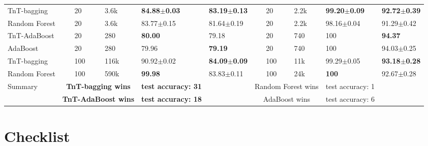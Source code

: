 \documentclass{article}
\begin{document}
\begin{table}[!htbp]
{\begin{tabular}{lllllllllll}
     TnT-bagging & & 20 &  3.6k  & \textbf{84.88$\pm$0.03} & \textbf{83.19$\pm$0.13} &
     & 20 &  2.2k  & \textbf{99.20$\pm$0.09} & \textbf{92.72$\pm$0.39} \\
     Random Forest & & 20 & 3.6k & 83.77$\pm$0.15 & 81.64$\pm$0.19 &
     & 20 & 2.2k & 98.16$\pm$0.04 & 91.29$\pm$0.42  \\\cmidrule{3-6} \cmidrule{8-11}
     TnT-AdaBoost & & 20 &  280  & \textbf{80.00} & 79.18 &
     & 20 &  740  & 100 & \textbf{94.37} \\
     AdaBoost & & 20 &  280 & 79.96 & \textbf{79.19} &
     & 20 &  740 & 100 & 94.03$\pm$0.25 \\\cmidrule{3-6} \cmidrule{8-11}
     
     TnT-bagging & & 100 &  116k  & 90.92$\pm$0.02 & \textbf{84.09$\pm$0.09} &
     & 100 &  11k  & 99.29$\pm$0.05 & \textbf{93.18$\pm$0.28}  \\
     Random Forest & & 100 & 590k & \textbf{99.98} & 83.83$\pm$0.11 &
     & 100 & 24k & \textbf{100} & 92.67$\pm$0.28\\
     
     \midrule
     \multirow{2}{*}{Summary} & \multicolumn{3}{c}{\textbf{TnT-bagging wins}} & \textbf{test accuracy: 31} & & \multicolumn{3}{c}{Random Forest wins}  & test accuracy: 1\\ \cmidrule{2-11}
     &\multicolumn{3}{c}{\textbf{TnT-AdaBoost wins}}  & \textbf{test accuracy: 18} & & \multicolumn{3}{c}{AdaBoost wins}  & test accuracy: 6\\
    \bottomrule
  \end{tabular}
  }
\end{table}







\section*{Checklist}
\end{document}
